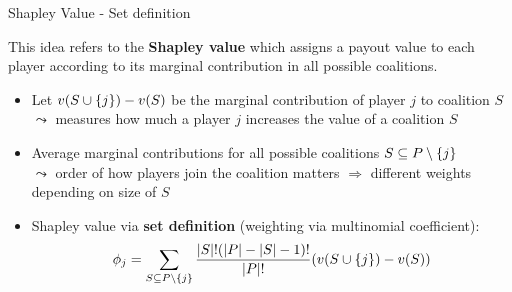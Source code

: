 \documentclass[11pt,compress,t,notes=noshow, aspectratio=169, xcolor=table]{beamer}
\begin{document}
\begin{frame}{Shapley Value - Set definition}

This idea refers to the \textbf{Shapley value} which assigns a payout value to each player according to its marginal contribution in all possible coalitions.
  
\begin{itemize}[<+->]
  \item Let $v(\Scupj) - v(S)$ be the marginal contribution of player $j$ to coalition $S$\\
  $\leadsto$ measures how much a player $j$ increases the value of a coalition $S$
  \item Average marginal contributions for all possible coalitions $\SsubPnoj$ \\
  $\leadsto$ order of how players join the coalition matters $\Rightarrow$ different weights depending on size of $S$\\
  \item Shapley value via \textbf{set definition} (weighting via multinomial coefficient): 
  $$\phi_j = \sum_{\SsubPnoj} \frac{|S|!(|P| - |S| - 1)!}{|P|!}(v(\Scupj) - v(S))$$
\end{itemize}

\end{frame}

\end{document}
